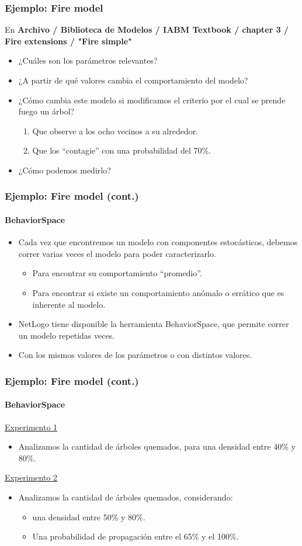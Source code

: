 \documentclass[11pt]{beamer}
\begin{document}
\begin{frame}
\frametitle{Ejemplo: Fire model}
En \textbf{Archivo / Biblioteca de Modelos / IABM Textbook / chapter 3 / Fire extensions / "Fire simple"}
\begin{itemize}
	\item ¿Cuáles son los parámetros relevantes?
	\item ¿A partir de qué valores cambia el comportamiento del modelo?
	\item ¿Cómo cambia este modelo si modificamos el criterio por el cual se prende fuego un árbol?
	\begin{enumerate}
		\item Que observe a los ocho vecinos a su alrededor.
		\item Que los ``contagie'' con una probabilidad del 70\%.
	\end{enumerate}
	\item ¿Cómo podemos medirlo?
\end{itemize}
\end{frame}

\begin{frame}
	\frametitle{Ejemplo: Fire model (cont.)}
	\framesubtitle{BehaviorSpace}
	\begin{itemize}
		\item Cada vez que encontremos un modelo con componentes estocásticos, debemos correr varias veces el modelo para poder caracterizarlo.
		\begin{itemize}
			\item Para encontrar su comportamiento ``promedio''.
			\item Para encontrar si existe un comportamiento anómalo o errático que es inherente al modelo.
		\end{itemize}
	\item NetLogo tiene disponible la herramienta BehaviorSpace, que permite correr un modelo repetidas veces.
	\item Con los mismos valores de los parámetros o con distintos valores. 
	\end{itemize}
\end{frame}

\begin{frame}
	\frametitle{Ejemplo: Fire model (cont.)}
	\framesubtitle{BehaviorSpace}
\underline{Experimento 1}
	\begin{itemize}
		\item Analizamos la cantidad de árboles quemados, para una densidad entre 40\% y 80\%. 
	\end{itemize}
\underline{Experimento 2}
\begin{itemize}
	\item Analizamos la cantidad de árboles quemados, considerando:
	\begin{itemize}
		\item una densidad entre 50\% y 80\%. 
		\item Una probabilidad de propagación entre el 65\% y el 100\%. 
	\end{itemize}
\end{itemize}
\end{frame}
\end{document}
